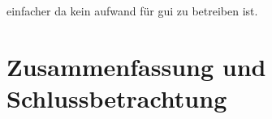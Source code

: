 \documentclass[11pt,english,ngerman, headsepline]{scrreprt}
\begin{document}
 einfacher da kein aufwand für gui zu betreiben ist.
 
\chapter{Zusammenfassung und Schlussbetrachtung}

 \cite{dsmUhrenArtikel}
 
\end{document}
